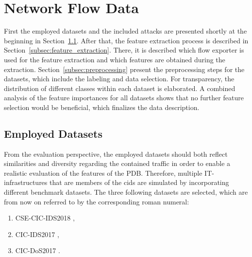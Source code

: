 \documentclass[../../main.tex]{subfiles}
\begin{document}
\section{Network Flow Data}
First the employed datasets and the included attacks are presented shortly at the beginning in Section~\ref{subsec:employed_datasets}. After that, the feature extraction process is described in Section~\ref{subsec:feature_extraction}. There, it is described which flow exporter is used for the feature extraction and which features are obtained during the extraction. Section~\ref{subsec:preprocessing} present the preprocessing steps for the datasets, which include the labeling and data selection. For transparency, the distribution of different classes within each dataset is elaborated. A combined analysis of the feature importances for all datasets shows that no further feature selection would be beneficial, which finalizes the data description.

\subsection{Employed Datasets}\label{subsec:employed_datasets}

From the evaluation perspective, the employed datasets should both reflect similarities and diversity regarding the contained traffic in order to enable a realistic evaluation of the features of the PDB. Therefore, multiple IT-infrastructures that are members of the \gls{cids} are simulated by incorporating different benchmark datasets. The three following datasets are selected, which are from now on referred to by the corresponding roman numeral:

\begin{enumerate}
    \item[\RomanNumeralCaps{1}] CSE-CIC-IDS2018 \cite{cse-cic-ids-2018},
    \item[\RomanNumeralCaps{2}] CIC-IDS2017 \cite{sharafaldin_toward_2018},
    \item[\RomanNumeralCaps{3}] CIC-DoS2017 \cite{jazi2017detecting}.
\end{enumerate}
\end{document}
